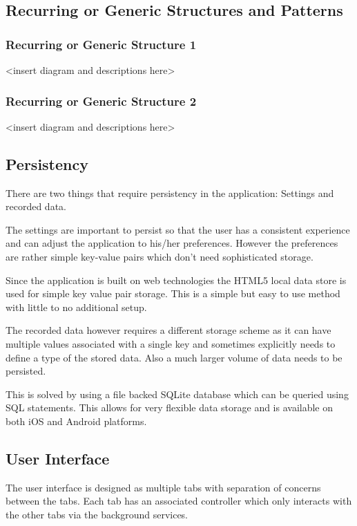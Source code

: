 \documentclass[]{article}
\begin{document}
\subsection{Recurring or Generic Structures and Patterns}

\subsubsection{Recurring or Generic Structure 1}

\textless{}insert diagram and descriptions here\textgreater{}

\subsubsection{Recurring or Generic Structure 2}

\textless{}insert diagram and descriptions here\textgreater{}

\subsection{Persistency}

There are two things that require persistency in the application: Settings and recorded data.

The settings are important to persist so that the user has a consistent experience and can adjust the application to his/her preferences. However the preferences are rather simple key-value pairs which don't need sophisticated storage.

Since the application is built on web technologies the HTML5 local data store is used for simple key value pair storage. This is a simple but easy to use method with little to no additional setup.

The recorded data however requires a different storage scheme as it can have multiple values associated with a single key and sometimes explicitly needs to define a type of the stored data. Also a much larger volume of data needs to be persisted. 

This is solved by using a file backed SQLite database which can be queried using SQL statements. This allows for very flexible data storage and is available on both iOS and Android platforms.

\subsection{User Interface}

The user interface is designed as multiple tabs with separation of concerns between the tabs. Each tab has an associated controller which only interacts with the other tabs via the background services. 
\end{document}
